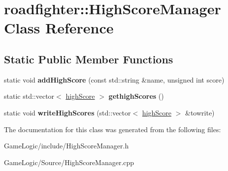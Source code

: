 \hypertarget{classroadfighter_1_1HighScoreManager}{}\section{roadfighter\+:\+:High\+Score\+Manager Class Reference}
\label{classroadfighter_1_1HighScoreManager}
\subsection*{Static Public Member Functions}
\begin{DoxyCompactItemize}
\item 
\mbox{\label{classroadfighter_1_1HighScoreManager_a9c40cba8af2b9db8bf76ed81c250f52d}} 
static void {\bfseries add\+High\+Score} (const std\+::string \&name, unsigned int score)
\item 
\mbox{\label{classroadfighter_1_1HighScoreManager_af5f73f94d50829ec3f13792c5fbb33bb}} 
static std\+::vector$<$ \hyperlink{structroadfighter_1_1highScore}{high\+Score} $>$ {\bfseries gethigh\+Scores} ()
\item 
\mbox{\label{classroadfighter_1_1HighScoreManager_aa3b964a1c4631093aa2542a0cd8c4f00}} 
static void {\bfseries write\+High\+Scores} (std\+::vector$<$ \hyperlink{structroadfighter_1_1highScore}{high\+Score} $>$ \&towrite)
\end{DoxyCompactItemize}


The documentation for this class was generated from the following files\+:\begin{DoxyCompactItemize}
\item 
Game\+Logic/include/High\+Score\+Manager.\+h\item 
Game\+Logic/\+Source/High\+Score\+Manager.\+cpp\end{DoxyCompactItemize}
